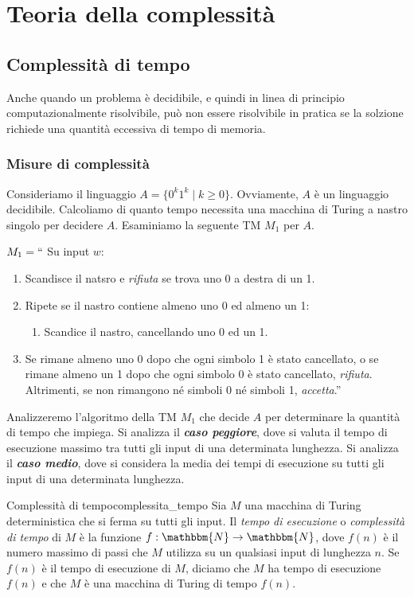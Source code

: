 \documentclass[12pt]{report}
\newcounter{definition}
\newcommand{\nmu}{}
\begin{document}
\part{Teoria della complessità}
\chapter{Complessità di tempo}
Anche quando un problema è decidibile, e quindi in linea di principio computazionalmente risolvibile, può non essere risolvibile in pratica se la solzione richiede una quantità eccessiva di tempo di memoria.
\section{Misure di complessità}
Consideriamo il linguaggio $A = \{0^k1^k \mid k \geq 0\}$. Ovviamente, $A$ è un linguaggio decidibile. Calcoliamo di quanto tempo necessita una macchina di Turing a nastro singolo per decidere $A$. Esaminiamo la seguente TM $M_1$ per $A$.

$M_1 = ``$ Su input $w$:
\begin{enumerate}
	\item Scandisce il natsro e \textit{rifiuta} se trova uno 0 a destra di un 1.
	\item Ripete se il nastro contiene almeno uno 0 ed almeno un 1:
	\begin{enumerate}
		\item Scandice il nastro, cancellando uno 0 ed un 1.
	\end{enumerate}
	\item Se rimane almeno uno 0 dopo che ogni simbolo 1 è stato cancellato, o se rimane almeno un 1 dopo che ogni simbolo 0 è stato cancellato, \textit{rifiuta}. Altrimenti, se non rimangono né simboli 0 né simboli 1, \textit{accetta}.''
\end{enumerate}
Analizzeremo l'algoritmo della TM $M_1$ che decide $A$ per determinare la quantità di tempo che impiega. Si analizza il \textbf{\textit{caso peggiore}}, dove si valuta il tempo di esecuzione massimo tra tutti gli input di una determinata lunghezza. Si analizza il \textbf{\textit{caso medio}}, dove si considera la media dei tempi di esecuzione su tutti gli input di una determinata lunghezza.
\begin{definition}{\nmu Complessità di tempo}{complessita_tempo}
	Sia $M$ una macchina di Turing deterministica che si ferma su tutti gli input. Il \textit{tempo di esecuzione} o \textit{complessità di tempo} di $M$ è la funzione $f: \mathbbm{N} \to \mathbbm{N}$, dove $f(n)$ è il numero massimo di passi che $M$ utilizza su un qualsiasi input di lunghezza $n$. Se $f(n)$ è il tempo di esecuzione di $M$, diciamo che $M$ ha tempo di esecuzione $f(n)$ e che $M$ è una macchina di Turing di tempo $f(n)$.
\end{definition}
\end{document}
